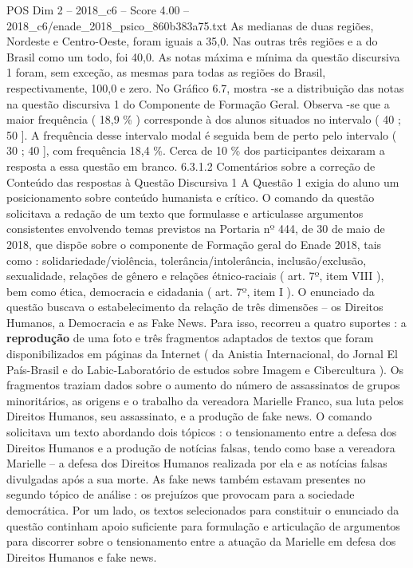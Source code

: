 \begin{textsample}{POS Dim 2 – 2018\_c6 – Score 4.00 – 2018\_c6/enade\_2018\_psico\_860b383a75.txt}
As medianas de duas regiões, Nordeste e Centro-Oeste, foram iguais a 35,0.
Nas outras três regiões e a do Brasil como um todo, foi 40,0.
As notas máxima e mínima da questão discursiva 1 foram, sem exceção, as mesmas para todas as regiões do Brasil, respectivamente, 100,0 e zero.
No Gráfico 6.7, mostra -se a distribuição das notas na questão discursiva 1 do Componente de Formação Geral.
Observa -se que a maior frequência ( 18,9 \% ) corresponde à dos alunos situados no intervalo ( 40 ; 50 ].
A frequência desse intervalo modal é seguida bem de perto pelo intervalo ( 30 ; 40 ], com frequência 18,4 \%.
Cerca de 10 \% dos participantes deixaram a resposta a essa questão em branco. 6.3.1.2 Comentários sobre a correção de Conteúdo das respostas à Questão Discursiva 1 A Questão 1 exigia do aluno um posicionamento sobre conteúdo humanista e crítico.
O comando da questão solicitava a redação de um texto que formulasse e articulasse argumentos consistentes envolvendo temas previstos na Portaria nº 444, de 30 de maio de 2018, que dispõe sobre o componente de Formação geral do Enade 2018, tais como : solidariedade/violência, tolerância/intolerância, inclusão/exclusão, sexualidade, relações de gênero e relações étnico-raciais ( art. 7º, item VIII ), bem como ética, democracia e cidadania ( art. 7º, item I ).
O enunciado da questão buscava o estabelecimento da relação de três dimensões – os Direitos Humanos, a Democracia e as Fake News.
Para isso, recorreu a quatro suportes : a \textbf{reprodução} de uma foto e três fragmentos adaptados de textos que foram disponibilizados em páginas da Internet ( da Anistia Internacional, do Jornal El País-Brasil e do Labic-Laboratório de estudos sobre Imagem e Cibercultura ).
Os fragmentos traziam dados sobre o aumento do número de assassinatos de grupos minoritários, as origens e o trabalho da vereadora Marielle Franco, sua luta pelos Direitos Humanos, seu assassinato, e a produção de fake news.
O comando solicitava um texto abordando dois tópicos : o tensionamento entre a defesa dos Direitos Humanos e a produção de notícias falsas, tendo como base a vereadora Marielle – a defesa dos Direitos Humanos realizada por ela e as notícias falsas divulgadas após a sua morte.
As fake news também estavam presentes no segundo tópico de análise : os prejuízos que provocam para a sociedade democrática.
Por um lado, os textos selecionados para constituir o enunciado da questão continham apoio suficiente para formulação e articulação de argumentos para discorrer sobre o tensionamento entre a atuação da Marielle em defesa dos Direitos Humanos e fake news.

\end{textsample}
